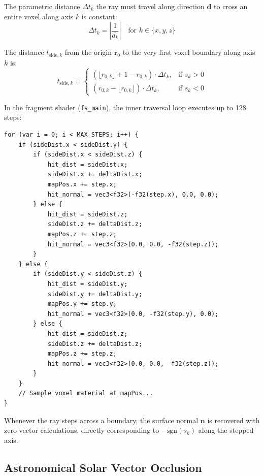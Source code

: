 The parametric distance $\Delta t_k$ the ray must travel along direction $\mathbf{d}$ to cross an entire voxel along axis $k$ is constant:
\begin{equation}
\Delta t_k = \left| \frac{1}{d_k} \right| \quad \text{for } k \in \{x, y, z\}
\label{eq:delta_t}
\end{equation}

The distance $t_{\mathrm{side}, k}$ from the origin $\mathbf{r}_0$ to the very first voxel boundary along axis $k$ is:
\begin{equation}
t_{\mathrm{side}, k} = \begin{cases}
(\lfloor r_{0,k} \rfloor + 1 - r_{0,k}) \cdot \Delta t_k, & \text{if } s_k > 0 \\
(r_{0,k} - \lfloor r_{0,k} \rfloor) \cdot \Delta t_k, & \text{if } s_k < 0
\end{cases}
\label{eq:side_t}
\end{equation}

In the fragment shader (\texttt{fs\_main}), the inner traversal loop executes up to 128 steps:
\begin{verbatim}
for (var i = 0; i < MAX_STEPS; i++) {
    if (sideDist.x < sideDist.y) {
        if (sideDist.x < sideDist.z) {
            hit_dist = sideDist.x;
            sideDist.x += deltaDist.x;
            mapPos.x += step.x;
            hit_normal = vec3<f32>(-f32(step.x), 0.0, 0.0);
        } else {
            hit_dist = sideDist.z;
            sideDist.z += deltaDist.z;
            mapPos.z += step.z;
            hit_normal = vec3<f32>(0.0, 0.0, -f32(step.z));
        }
    } else {
        if (sideDist.y < sideDist.z) {
            hit_dist = sideDist.y;
            sideDist.y += deltaDist.y;
            mapPos.y += step.y;
            hit_normal = vec3<f32>(0.0, -f32(step.y), 0.0);
        } else {
            hit_dist = sideDist.z;
            sideDist.z += deltaDist.z;
            mapPos.z += step.z;
            hit_normal = vec3<f32>(0.0, 0.0, -f32(step.z));
        }
    }
    // Sample voxel material at mapPos...
}
\end{verbatim}

Whenever the ray steps across a boundary, the surface normal $\mathbf{n}$ is recovered with zero vector calculations, directly corresponding to $-\mathrm{sgn}(s_k)$ along the stepped axis.

\subsection{Astronomical Solar Vector Occlusion}

